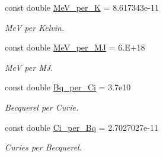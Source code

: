 \begin{Indent}
\begin{DoxyCompactItemize}
\mbox{\label{namespacepyne_af4fb3aac22e7bda0ece3bcf515151611}} 
const double \hyperlink{namespacepyne_af4fb3aac22e7bda0ece3bcf515151611}{Me\+V\+\_\+per\+\_\+K} = 8.\+617343e-\/11
\begin{DoxyCompactList}\small\item\em MeV per Kelvin. \end{DoxyCompactList}\item 
\mbox{\label{namespacepyne_a911408381cffba2ad9a97fb5f9f6db79}} 
const double \hyperlink{namespacepyne_a911408381cffba2ad9a97fb5f9f6db79}{Me\+V\+\_\+per\+\_\+\+MJ} = 6.\+E+18
\begin{DoxyCompactList}\small\item\em MeV per MJ. \end{DoxyCompactList}\item 
\mbox{\label{namespacepyne_a3fe0af70afecb7086dd59a5d3d5abd43}} 
const double \hyperlink{namespacepyne_a3fe0af70afecb7086dd59a5d3d5abd43}{Bq\+\_\+per\+\_\+\+Ci} = 3.\+7e10
\begin{DoxyCompactList}\small\item\em Becquerel per Curie. \end{DoxyCompactList}\item 
\mbox{\label{namespacepyne_af67330218cc9e0d1b6fd2d8eca3f8cf8}} 
const double \hyperlink{namespacepyne_af67330218cc9e0d1b6fd2d8eca3f8cf8}{Ci\+\_\+per\+\_\+\+Bq} = 2.\+7027027e-\/11
\begin{DoxyCompactList}\small\item\em Curies per Becquerel. \end{DoxyCompactList}\end{DoxyCompactItemize}
\end{Indent}
